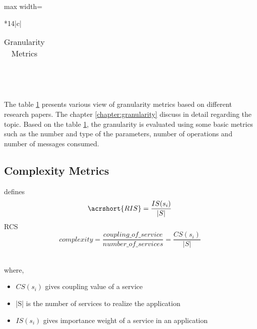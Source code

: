 {{{{\begin{table}[h!]
\begin{adjustbox}{max width=\textwidth}
\begin{tabular}{*{14}{|c}|}
\begin{tabular}{cl}
                    \end{tabular}\\
                    \hline
\end{tabular}
\end{adjustbox}
  \caption{Granularity Metrics}
  \label{tab:quality_of_service/quality_attributes/granularity_metrics}
\end{table}
\\
The table \ref{tab:quality_of_service/quality_attributes/granularity_metrics} presents various view of granularity metrics based on different research papers. The chapter \ref{chapter:granularity} discuss in detail regarding the topic. Based on the table \ref{tab:quality_of_service/quality_attributes/granularity_metrics}, the granularity is evaluated using some basic metrics such as the number and type of the parameters, number of operations and number of messages consumed.
\\

\subsection{Complexity Metrics}{\label{section:quality_of_service/quality_metrics/complexity}

\cite{Zhang:2009aa} defines
$$ \acrshort{RIS} = \frac{IS(s_i)}{|S|}$$
\acrshort{RCS}
\\

$$  complexity = \frac{coupling\_of\_service}{number\_of\_services} = \frac{CS(s_i)}{|S|}$$

\\
where,
\\
\begin{itemize}[leftmargin=.5in]
\item $CS(s_i)$ gives coupling value of a service
\item |S| is the number of services to realize the application
\item $IS(s_i)$ gives importance weight of a service in an application
\end{itemize}

}}}}}
